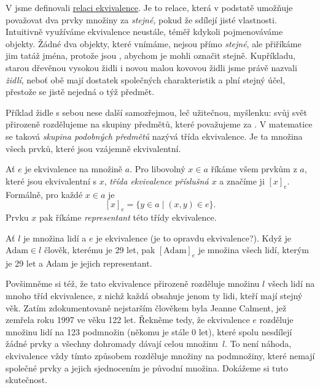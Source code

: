 V  jsme definovali
\hyperref[def:relace-ekvivalence]{relaci ekvivalence}. Je to relace, která v
podstatě umožňuje považovat dva prvky množiny za \emph{stejné}, pokud že sdílejí
jisté vlastnosti. Intuitivně využíváme ekvivalence neustále, téměř kdykoli
pojmenováváme objekty. Žádné dva objekty, které vnímáme, nejsou přímo
\emph{stejné}, ale přiříkáme jim tatáž jména, protože jsou , abychom je mohli označit stejně. Kupříkladu, starou dřevěnou vysokou
židli i novou malou kovovou židli jsme právě nazvali \emph{židlí}, neboť obě
mají dostatek společných charakteristik a plní stejný účel, přestože se jistě
nejedná o týž předmět.

Příklad židle s sebou nese další samozřejmou, leč užitečnou, myšlenku: svůj svět
přirozeně rozdělujeme na skupiny předmětů, které považujeme za . V
matematice se taková \emph{skupina podobných předmětů} nazývá \alert{třída
ekvivalence}. Je ta množina všech prvků, které jsou vzájemně ekvivalentní.

\begin{definition}
  \label{def:trida-ekvivalence}
  Ať $e$ je ekvivalence na množině $a$. Pro libovolný $x \in a$ říkáme všem
  prvkům z $a$, které jsou ekvivalentní s $x$, \emph{třída ekvivalence příslušná
  $x$} a značíme ji $[x]_e$. Formálně, pro každé $x \in a$ je
  \[
    [x]_e = \{y \in a \mid (x, y) \in e\}.
  \]
  Prvku $x$ pak říkáme \emph{representant} této třídy ekvivalence.
\end{definition}
\begin{example}
  \label{exam:trida-ekvivalence-1}
  Ať $l$ je množina lidí a $e$ je ekvivalence  (je to
  opravdu ekvivalence?). Když je $\text{Adam} \in l$ člověk, kterému je 29 let,
  pak $[\text{Adam}]_e$ je množina všech lidí, kterým je 29 let a Adam je jejich
  representant.

  Povšimněme si též, že tato ekvivalence přirozeně rozděluje množinu $l$ všech
  lidí na mnoho tříd ekvivalence, z nichž každá obsahuje jenom ty lidi, kteří
  mají stejný věk. Zatím zdokumentovaně nejstarším člověkem byla Jeanne Calment,
  jež zemřela roku 1997 ve věku 122 let. Řekněme tedy, že ekvivalence $e$
  rozděluje množinu lidí na 123 podmnožin (někomu je stále 0 let), které spolu
  nesdílejí žádné prvky a všechny dohromady dávají celou množinu~$l$. To není
  náhoda, ekvivalence vždy tímto způsobem rozděluje množiny na podmnožiny, které
  nemají společné prvky a jejich sjednocením je původní množina. Dokážeme si
  tuto skutečnost.
\end{example}

